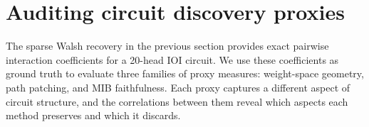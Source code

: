 %

\section{Auditing circuit discovery proxies}
\label{sec:auditing}

The sparse Walsh recovery in the previous section provides exact
pairwise interaction coefficients for a 20-head IOI circuit. We use
these coefficients as ground truth to evaluate three families of proxy
measures: weight-space geometry, path patching, and MIB faithfulness.
Each proxy captures a different aspect of circuit structure, and the
correlations between them reveal which aspects each method preserves and
which it discards.






